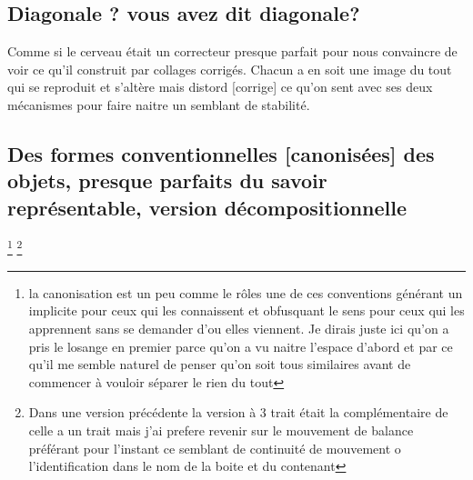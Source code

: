 \documentclass{article}
\begin{document}
\subsection{Diagonale ? vous avez dit diagonale?}
Comme si le cerveau était un correcteur presque parfait pour nous convaincre de voir  ce qu'il construit par collages corrigés.
Chacun a en soit une image du tout qui se reproduit et s'altère mais distord [corrige] ce qu'on sent avec ses deux mécanismes pour faire naitre un semblant de stabilité. 

\subsection{Des formes conventionnelles [canonisées] des objets, presque parfaits du savoir représentable, version décompositionnelle}
\footnote{la canonisation est un peu comme le rôles une de ces conventions générant un implicite pour ceux qui les connaissent et obfusquant le sens pour ceux qui les apprennent sans se demander d'ou elles viennent. Je dirais juste ici qu'on a pris le losange en premier parce qu'on a vu naitre l'espace d'abord et par ce qu'il me semble naturel de penser qu'on soit tous similaires avant de commencer à vouloir séparer le rien du tout}
\footnote{Dans une version précédente la version à 3 trait était la complémentaire de celle a un trait  mais j'ai prefere revenir sur le mouvement de balance préférant pour l'instant ce semblant de continuité de mouvement  o l'identification dans le nom de la boite et du contenant}
\end{document}
